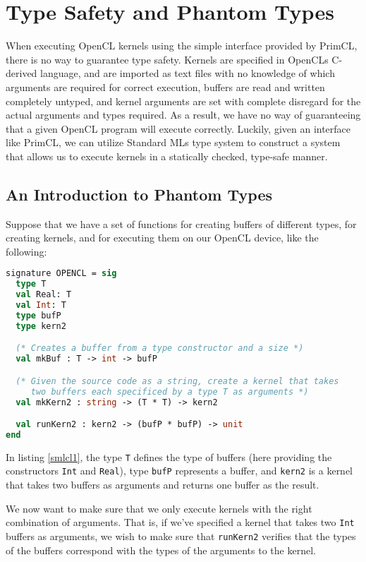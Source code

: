 \section{Type Safety and Phantom Types}

When executing OpenCL kernels using the simple interface provided by
PrimCL, there is no way to guarantee type safety. Kernels are
specified in OpenCLs C-derived language, and are imported as text
files with no knowledge of which arguments are required for correct
execution, buffers are read and written completely untyped, and kernel
arguments are set with complete disregard for the actual arguments and
types required. As a result, we have no way of guaranteeing that a
given OpenCL program will execute correctly. Luckily, given an
interface like PrimCL, we can utilize Standard MLs type system to
construct a system that allows us to execute kernels in a statically
checked, type-safe manner.

\subsection{An Introduction to Phantom Types}

Suppose that we have a set of functions for creating buffers of
different types, for creating kernels, and for executing them on our
OpenCL device, like the following:

\begin{lstlisting}[language=ML, caption=Signatures for a primitive
    SmlCL module,label=smlcl1,mathescape]
signature OPENCL = sig
  type T
  val Real: T
  val Int: T
  type bufP
  type kern2

  (* Creates a buffer from a type constructor and a size *)
  val mkBuf : T -> int -> bufP

  (* Given the source code as a string, create a kernel that takes
     two buffers each specificed by a type T as arguments *)
  val mkKern2 : string -> (T * T) -> kern2

  val runKern2 : kern2 -> (bufP * bufP) -> unit
end
\end{lstlisting}

In listing \ref{smlcl1}, the type \texttt{T} defines the type of
buffers (here providing the constructors \texttt{Int} and
\texttt{Real}), type \texttt{bufP} represents a buffer, and
\texttt{kern2} is a kernel that takes two buffers as arguments and
returns one buffer as the result.

We now want to make sure that we only execute kernels with the right
combination of arguments. That is, if we've specified a kernel that
takes two \texttt{Int} buffers as arguments, we wish to make sure that
\texttt{runKern2} verifies that the types of the buffers correspond
with the types of the arguments to the kernel.

